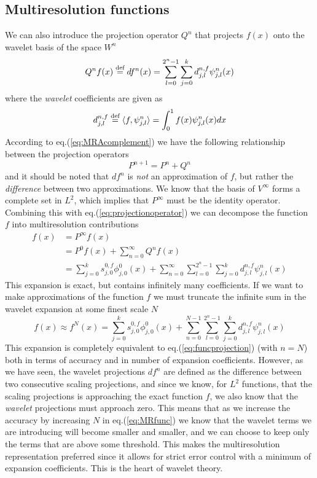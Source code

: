 \subsection{Multiresolution functions}
We can also introduce the projection operator $Q^n$ that projects
$f(x)$ onto the wavelet basis of the space $W^n$
\begin{equation}
	Q^nf(x) \stackrel{\text{def}}{\hbox{=}} df^n(x) =
	\sum_{l=0}^{2^n-1}\sum_{j=0}^kd^{n,f}_{j,l}\psi^n_{j,l}(x)
\end{equation}
where the \emph{wavelet} coefficients are given as
\begin{equation}
	d^{n,f}_{j,l} \stackrel{\text{def}}{\hbox{=}} \langle f, \psi^n_{j,l}\rangle =
	\int_0^1f(x)\psi^n_{j,l}(x)dx
\end{equation}
According to eq.(\ref{eq:MRAcomplement}) we have the following relationship
between the projection operators
\begin{equation}
	\label{eq:projectionoperator}
	P^{n+1} = P^n + Q^n
\end{equation}
and it should be noted that $df^n$ is \emph{not} an approximation of $f$, but
rather the \emph{difference} between two approximations. We know that the
basis of $V^\infty$ forms a complete set in $L^2$, which implies that
$P^\infty$ must be the identity operator. Combining this with
eq.(\ref{eq:projectionoperator}) we can decompose the function $f$ into
multiresolution contributions
\begin{align}
	\label{eq:MRfuncinf}
		\nonumber
		f(x) 	&= P^\infty f(x)\\
		\nonumber
			&= P^0f(x) + \sum_{n=0}^\infty Q^nf(x)\\
			&= \sum_{j=0}^ks^{0,f}_{j,0}\phi^0_{j,0}(x) +
			\sum_{n=0}^\infty\sum_{l=0}^{2^n-1}\sum_{j=0}^kd^{n,f}_{j,l}
			\psi^n_{j,l}(x)
\end{align}
This expansion is exact, but contains infinitely many coefficients. If we
want to make approximations of the function $f$ we must truncate the infinite
sum in the wavelet expansion at some finest scale $N$
\begin{equation}
	\label{eq:MRfunc}
	f(x) \approx f^N(x) = \sum_{j=0}^ks^{0,f}_{j,0}\phi^0_{j,0}(x) +
	\sum_{n=0}^{N-1}\sum_{l=0}^{2^n-1}\sum_{j=0}^kd^{n,f}_{j,l}\psi^n_{j,l}(x)
\end{equation}
This expansion is completely equivalent to eq.(\ref{eq:funcprojection}) (with
$n=N$) both in terms of accuracy and in number of expansion coefficients. 
However, as we have seen, the wavelet projections $df^n$ are defined as the 
difference between two 
consecutive scaling projections, and since we know, for $L^2$ functions, that 
the scaling projections is approaching the exact function $f$, we also know 
that the \emph{wavelet} projections must approach zero. This means that as we
increase the accuracy by increasing $N$ in eq.(\ref{eq:MRfunc}) we know that the
wavelet terms we are introducing will become smaller and smaller, and we can
choose to keep only the terms that are above some threshold. This makes the
multiresolution representation preferred since it allows for strict error
control with a minimum of expansion coefficients. This is the heart of wavelet 
theory.

